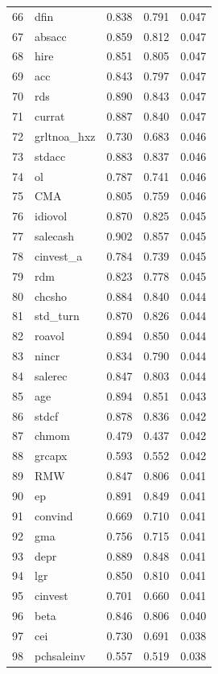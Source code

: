 \begin{footnotesize}
\begin{longtable}{rl|c|c|c}
		66 & dfin & 0.838 & 0.791 & 0.047 \\ 
		67 & absacc & 0.859 & 0.812 & 0.047 \\ 
		68 & hire & 0.851 & 0.805 & 0.047 \\ 
		69 & acc & 0.843 & 0.797 & 0.047 \\ 
		70 & rds & 0.890 & 0.843 & 0.047 \\ 
		71 & currat & 0.887 & 0.840 & 0.047 \\ 
		72 & grltnoa\_hxz & 0.730 & 0.683 & 0.046 \\ 
		73 & stdacc & 0.883 & 0.837 & 0.046 \\ 
		74 & ol & 0.787 & 0.741 & 0.046 \\ 
		75 & CMA & 0.805 & 0.759 & 0.046 \\ 
		76 & idiovol & 0.870 & 0.825 & 0.045 \\ 
		77 & salecash & 0.902 & 0.857 & 0.045 \\ 
		78 & cinvest\_a & 0.784 & 0.739 & 0.045 \\ 
		79 & rdm & 0.823 & 0.778 & 0.045 \\ 
		80 & chcsho & 0.884 & 0.840 & 0.044 \\ 
		81 & std\_turn & 0.870 & 0.826 & 0.044 \\ 
		82 & roavol & 0.894 & 0.850 & 0.044 \\ 
		83 & nincr & 0.834 & 0.790 & 0.044 \\ 
		84 & salerec & 0.847 & 0.803 & 0.044 \\ 
		85 & age & 0.894 & 0.851 & 0.043 \\ 
		86 & stdcf & 0.878 & 0.836 & 0.042 \\ 
		87 & chmom & 0.479 & 0.437 & 0.042 \\ 
		88 & grcapx & 0.593 & 0.552 & 0.042 \\ 
		89 & RMW & 0.847 & 0.806 & 0.041 \\ 
		90 & ep & 0.891 & 0.849 & 0.041 \\ 
		91 & convind & 0.669 & 0.710 & 0.041 \\ 
		92 & gma & 0.756 & 0.715 & 0.041 \\ 
		93 & depr & 0.889 & 0.848 & 0.041 \\ 
		94 & lgr & 0.850 & 0.810 & 0.041 \\ 
		95 & cinvest & 0.701 & 0.660 & 0.041 \\ 
		96 & beta & 0.846 & 0.806 & 0.040 \\ 
		97 & cei & 0.730 & 0.691 & 0.038 \\ 
		98 & pchsaleinv & 0.557 & 0.519 & 0.038 \\ 

\end{longtable}
\end{footnotesize}
